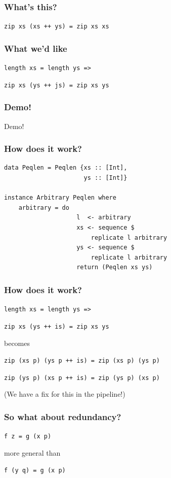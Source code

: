 \documentclass{beamer}
\begin{document}
\begin{frame}
    \frametitle{What's this?}
        \Large{\centerline{\texttt{zip xs (xs ++ ys) = zip xs xs}}}
\end{frame}

\begin{frame}
    \frametitle{What we'd like}
    \Large{\centerline{\texttt{length xs = length ys =>}}
    \centerline{\texttt{zip xs (ys ++ js) = zip xs ys}}}
\end{frame}

\begin{frame}
    \frametitle{Demo!}
        \Huge{\centerline{Demo!}}
\end{frame}

\begin{frame}[fragile]
    \frametitle{How does it work?}
    \begin{verbatim}
data Peqlen = Peqlen {xs :: [Int],
                      ys :: [Int]}

instance Arbitrary Peqlen where
    arbitrary = do
                    l  <- arbitrary 
                    xs <- sequence $
                        replicate l arbitrary
                    ys <- sequence $
                        replicate l arbitrary
                    return (Peqlen xs ys)
        \end{verbatim}

\end{frame}

\begin{frame}
    \frametitle{How does it work?}
    \Large{\centerline{\texttt{length xs = length ys =>}}}
    \Large{\centerline{\texttt{zip xs (ys ++ is) = zip xs ys}}}
        \centerline{}
        \centerline{becomes}
        \centerline{}
        \Large{\centerline{\texttt{zip (xs p) (ys p ++ is) = zip (xs p) (ys p)}}}
        \pause
        \centerline{}
        \centerline{\texttt{zip (ys p) (xs p ++ is) = zip (ys p) (xs p)}}
        \centerline{}
        \centerline{(We have a fix for this in the pipeline!)}
\end{frame}

\begin{frame}
    \frametitle{So what about redundancy?}
        \Large{\centerline{\texttt{f z = g (x p)}}}
        \centerline{}
        \centerline{more general than}
        \centerline{}
        \Large{\centerline{\texttt{f (y q) = g (x p)}}}
\end{frame}
\end{document}
